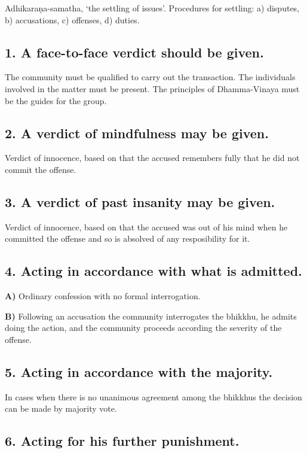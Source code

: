 Adhikaraṇa-samatha, `the settling of issues'. Procedures for settling:
a) disputes, b) accusations, c) offenses, d) duties.

\subsection{1. A face-to-face verdict should be given.}

The community must be qualified to carry out the transaction. The
individuals involved in the matter must be present. The principles of
Dhamma-Vinaya must be the guides for the group.

\subsection{2. A verdict of mindfulness may be given.}

Verdict of innocence, based on that the accused remembers fully that he
did not commit the offense.

\subsection{3. A verdict of past insanity may be given.}

Verdict of innocence, based on that the accused was out of his mind when
he committed the offense and so is absolved of any resposibility for it.

\clearpage

\subsection{4. Acting in accordance with what is admitted.}

\textbf{A)} Ordinary confession with no formal interrogation.

\textbf{B)} Following an accusation the community interrogates the
bhikkhu, he admits doing the action, and the community proceeds
according the severity of the offense.

\subsection{5. Acting in accordance with the majority.}

In cases when there is no unanimous agreement among the bhikkhus the
decision can be made by majority vote.

\subsection{6. Acting for his further punishment.}

